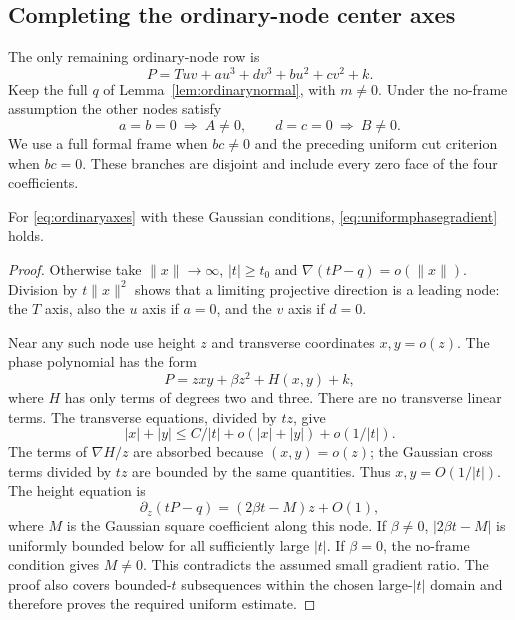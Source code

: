 \subsection{Completing the ordinary-node center axes}
\label{sec:ordinaryaxes}

The only remaining ordinary-node row is
\begin{equation}\label{eq:ordinaryaxes}
 P=Tuv+a u^3+d v^3+b u^2+c v^2+k.
\end{equation}
Keep the full $q$ of Lemma~\ref{lem:ordinarynormal}, with
$m\ne0$. Under the no-frame assumption the other nodes satisfy
\[
 a=b=0\ \Longrightarrow\ A\ne0,\qquad
 d=c=0\ \Longrightarrow\ B\ne0.
\]
We use a full formal frame when $bc\ne0$ and the preceding
uniform cut criterion when $bc=0$. These branches are disjoint
and include every zero face of the four coefficients.

\begin{lemma}\label{lem:axisuniformgradient}
For \eqref{eq:ordinaryaxes} with these Gaussian conditions,
\eqref{eq:uniformphasegradient} holds.
\end{lemma}
\begin{proof}
Otherwise take $\|x\|\to\infty$, $|t|\ge t_0$ and
$\nabla(tP-q)=o(\|x\|)$. Division by $t\|x\|^2$ shows that
a limiting projective direction is a leading node: the $T$ axis,
also the $u$ axis if $a=0$, and the $v$ axis if $d=0$.

Near any such node use height $z$ and transverse coordinates
$x,y=o(z)$. The phase polynomial has the form
\[
 P=zxy+\beta z^2+H(x,y)+k,
\]
where $H$ has only terms of degrees two and three. There are
no transverse linear terms. The transverse equations, divided
by $tz$, give
\[
 |x|+|y|\le C/|t|+o(|x|+|y|)+o(1/|t|).
\]
The terms of $\nabla H/z$ are absorbed because $(x,y)=o(z)$;
the Gaussian cross terms divided by $tz$ are bounded by the
same quantities. Thus $x,y=O(1/|t|)$. The height equation is
\[
 \partial_z(tP-q)=(2\beta t-M)z+O(1),
\]
where $M$ is the Gaussian square coefficient along this node.
If $\beta\ne0$, $|2\beta t-M|$ is uniformly bounded below
for all sufficiently large $|t|$. If $\beta=0$, the no-frame
condition gives $M\ne0$. This contradicts the assumed small
gradient ratio. The proof also covers bounded-$t$ subsequences
within the chosen large-$|t|$ domain and therefore proves the
required uniform estimate.
\end{proof}

